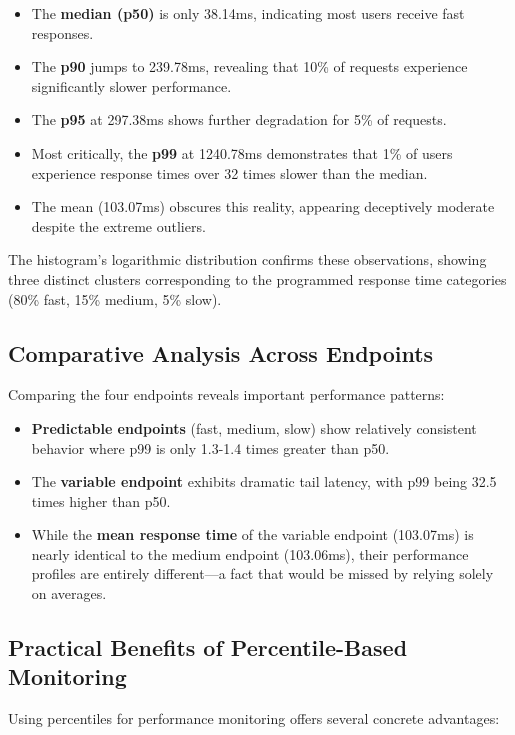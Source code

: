 \documentclass[12pt,letterpaper]{article}
\begin{document}
\begin{itemize}
    \item The \textbf{median (p50)} is only 38.14ms, indicating most users receive fast responses.
    \item The \textbf{p90} jumps to 239.78ms, revealing that 10\% of requests experience significantly slower performance.
    \item The \textbf{p95} at 297.38ms shows further degradation for 5\% of requests.
    \item Most critically, the \textbf{p99} at 1240.78ms demonstrates that 1\% of users experience response times over 32 times slower than the median.
    \item The mean (103.07ms) obscures this reality, appearing deceptively moderate despite the extreme outliers.
\end{itemize}

The histogram's logarithmic distribution confirms these observations, showing three distinct clusters corresponding to the programmed response time categories (80\% fast, 15\% medium, 5\% slow).

\subsection{Comparative Analysis Across Endpoints}

Comparing the four endpoints reveals important performance patterns:

\begin{itemize}
    \item \textbf{Predictable endpoints} (fast, medium, slow) show relatively consistent behavior where p99 is only 1.3-1.4 times greater than p50.
    \item The \textbf{variable endpoint} exhibits dramatic tail latency, with p99 being 32.5 times higher than p50.
    \item While the \textbf{mean response time} of the variable endpoint (103.07ms) is nearly identical to the medium endpoint (103.06ms), their performance profiles are entirely different—a fact that would be missed by relying solely on averages.
\end{itemize}

\subsection{Practical Benefits of Percentile-Based Monitoring}

Using percentiles for performance monitoring offers several concrete advantages:
\end{document}

